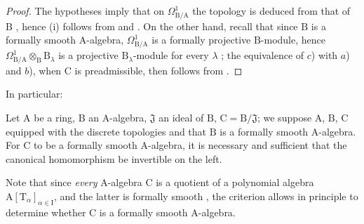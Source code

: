 \begin{proof}
The hypotheses imply that on $\Omega^1_{\mathrm{B}/\mathrm{A}}$ the topology
is deduced from that of $\mathrm{B}$ , hence (i) follows from
 and . On the other hand, recall
 that since $\mathrm{B}$ is a formally smooth
$\mathrm{A}$-algebra, $\Omega^1_{\mathrm{B}/\mathrm{A}}$ is a formally
projective $\mathrm{B}$-module, hence
$\Omega^1_{\mathrm{B}/\mathrm{A}}\otimes_\mathrm{B}\mathrm{B}_\lambda$ is a
projective $\mathrm{B}_\lambda$-module for every $\lambda$
; the equivalence of $c$) with $a$) and $b$), when $\mathrm{C}$
is preadmissible, then follows from .
\end{proof}

In particular:
\begin{corollary}[22.6.3]
\label{0.22.6.3}
Let $\mathrm{A}$ be a ring, $\mathrm{B}$ an $\mathrm{A}$-algebra, $\mathfrak{J}$ an ideal of $\mathrm{B}$, $\mathrm{C}=\mathrm{B}/\mathfrak{J}$; we suppose $\mathrm{A}$, $\mathrm{B}$, $\mathrm{C}$ equipped with the discrete topologies and that $\mathrm{B}$ is a formally smooth $\mathrm{A}$-algebra.
For $\mathrm{C}$ to be a formally smooth $\mathrm{A}$-algebra, it is necessary and sufficient that the canonical homomorphism  be invertible on the left.
\end{corollary}

Note that since \emph{every} $\mathrm{A}$-algebra $\mathrm{C}$ is a quotient of a polynomial algebra $\mathrm{A}[\mathrm{T}_\alpha]_{\alpha\in\mathrm{I}}$, and the latter is formally smooth , the criterion  allows in principle to determine whether $\mathrm{C}$ is a formally smooth $\mathrm{A}$-algebra.

